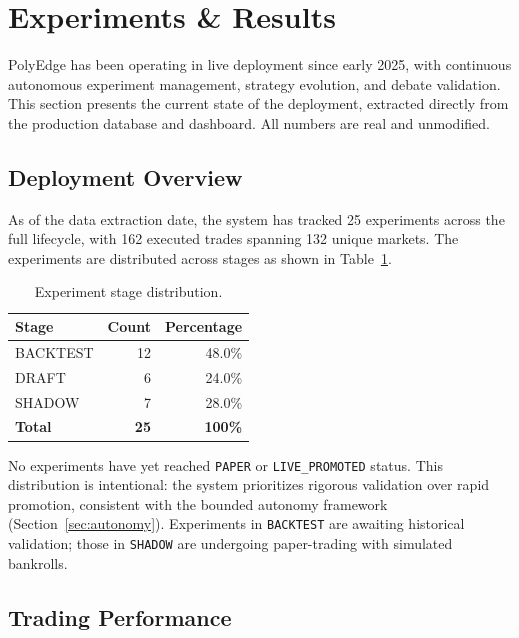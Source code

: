 \section{Experiments \& Results}\label{sec:results}

PolyEdge has been operating in live deployment since early 2025, with continuous autonomous experiment management, strategy evolution, and debate validation. This section presents the current state of the deployment, extracted directly from the production database and dashboard. All numbers are real and unmodified.

\subsection{Deployment Overview}

As of the data extraction date, the system has tracked 25 experiments across the full lifecycle, with 162 executed trades spanning 132 unique markets. The experiments are distributed across stages as shown in Table~\ref{tab:experiments}.

\begin{table}[H]
    \centering
    \caption{Experiment stage distribution.}
    \label{tab:experiments}
    \begin{tabular}{lrr}
        \toprule
        \textbf{Stage} & \textbf{Count} & \textbf{Percentage} \\
        \midrule
        BACKTEST & 12 & 48.0\% \\
        DRAFT & 6 & 24.0\% \\
        SHADOW & 7 & 28.0\% \\
        \midrule
        \textbf{Total} & \textbf{25} & \textbf{100\%} \\
        \bottomrule
    \end{tabular}
\end{table}

No experiments have yet reached \texttt{PAPER} or \texttt{LIVE\_PROMOTED} status. This distribution is intentional: the system prioritizes rigorous validation over rapid promotion, consistent with the bounded autonomy framework (Section~\ref{sec:autonomy}). Experiments in \texttt{BACKTEST} are awaiting historical validation; those in \texttt{SHADOW} are undergoing paper-trading with simulated bankrolls.

\subsection{Trading Performance}

